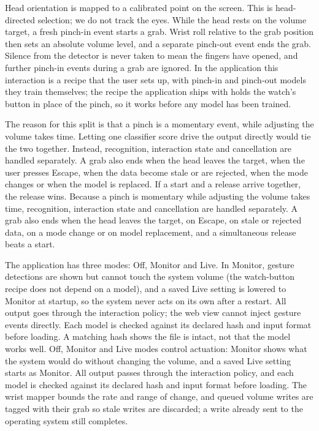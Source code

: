 \label{head-targeting-and-paired-interaction}

Head orientation is mapped to a calibrated point on the screen. This is head-directed selection; we do not track the eyes. While the head rests on the volume target, a fresh pinch-in event starts a grab. Wrist roll relative to the grab position then sets an absolute volume level, and a separate pinch-out event ends the grab. Silence from the detector is never taken to mean the fingers have opened, and further pinch-in events during a grab are ignored.
\iffull
In the application this interaction is a recipe that the user sets up, with pinch-in and pinch-out models they train themselves; the recipe the application ships with holds the watch's button in place of the pinch, so it works before any model has been trained.
\fi

\iffull
The reason for this split is that a pinch is a momentary event, while adjusting the volume takes time. Letting one classifier score drive the output directly would tie the two together. Instead, recognition, interaction state and cancellation are handled separately. A grab also ends when the head leaves the target, when the user presses Escape, when the data become stale or are rejected, when the mode changes or when the model is replaced. If a start and a release arrive together, the release wins.
\else
Because a pinch is momentary while adjusting the volume takes time, recognition, interaction state and cancellation are handled separately. A grab also ends when the head leaves the target, on Escape, on stale or rejected data, on a mode change or on model replacement, and a simultaneous release beats a start.
\fi

\label{bounded-actuation-and-failure-handling}

\iffull
The application has three modes: Off, Monitor and Live. In Monitor, gesture detections are shown but cannot touch the system volume (the watch-button recipe does not depend on a model), and a saved Live setting is lowered to Monitor at startup, so the system never acts on its own after a restart. All output goes through the interaction policy; the web view cannot inject gesture events directly. Each model is checked against its declared hash and input format before loading. A matching hash shows the file is intact, not that the model works well.
\else
Off, Monitor and Live modes control actuation: Monitor shows what the system would do without changing the volume, and a saved Live setting starts as Monitor. All output passes through the interaction policy, and each model is checked against its declared hash and input format before loading. The wrist mapper bounds the rate and range of change, and queued volume writes are tagged with their grab so stale writes are discarded; a write already sent to the operating system still completes.
\fi

